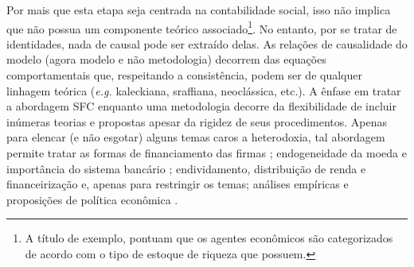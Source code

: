Por mais que esta etapa seja centrada na contabilidade social, isso não implica que não possua um componente teórico associado\footnote{A título de exemplo, \textcite[p.~15--16]{macedo_e_silva_peering_2011}  pontuam que %
	os agentes econômicos são categorizados de acordo com o tipo de estoque de riqueza que possuem.
}. 
No entanto, por se tratar de identidades, nada de causal pode ser extraído delas. As relações de causalidade do modelo (agora modelo e não metodologia) decorrem das equações comportamentais que, respeitando a consistência, podem ser de qualquer linhagem teórica (\textit{e.g.} kaleckiana, sraffiana, neoclássica, etc.). A ênfase em tratar a abordagem SFC enquanto uma metodologia decorre da flexibilidade de incluir inúmeras teorias e propostas apesar da rigidez de seus procedimentos. Apenas para elencar (e não esgotar) alguns temas caros a heterodoxia, tal abordagem permite tratar as formas de financiamento das firmas \cites{asimakopulos_kalecki_1983}{skott_finance_1988}{messori_financing_1991}; endogeneidade da moeda e importância do sistema bancário \cites{messori_financing_1991}{dow_horizontalism:_1996}{arestis_theoretical_1996}{godley_money_1999}{lavoie_note_1999}{lima_macrodynamics_2007}; endividamento, distribuição de renda e financeirização \cites{palley_inside_1996}{wolfson_irving_1996}{palley_money_1997}{palley_financial_2002}{dos_santos_revisiting_2009}{palley_inside_2010}{hein_finance-dominated_2012} e, apenas para restringir os temas; análises empíricas e proposições de política econômica \cites{godley_seven_1999}{godley_fiscal_2007}{godley_simple_2007}{arestis_income_2011}. 


